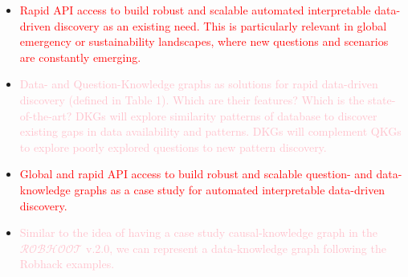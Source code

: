 \documentclass[11pt, a4paper]{article} %
\begin{document}
\begin{itemize}
      \item \textcolor{red}{Rapid API access to build
          robust and scalable automated interpretable data-driven
          discovery as an existing need. This is particularly relevant
          in global emergency or sustainability landscapes, where new
          questions and scenarios are constantly emerging.}
      \item \textcolor{pink}{Data- and Question-Knowledge graphs as
          solutions for rapid data-driven discovery (defined in Table
          1). Which are their features? Which is the state-of-the-art?
          DKGs will explore similarity patterns of database to
          discover existing gaps in data availability and
          patterns. DKGs will complement QKGs to explore poorly
          explored questions to new pattern discovery.  }
      \item \textcolor{red}{Global and rapid API access to build
          robust and scalable question- and data-knowledge graphs as a
          case study for automated interpretable data-driven
          discovery.}
      \item \textcolor{pink}{Similar to the idea of having a case
          study causal-knowledge graph in the $\mathcal{ROBHOOT}$
          v.2.0, we can represent a data-knowledge graph following the
          Robhack examples.}
      \end{itemize}
      
\end{document}
